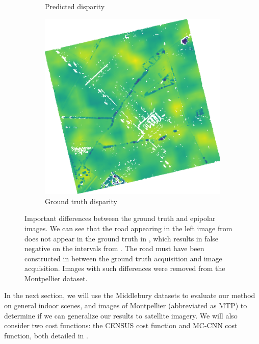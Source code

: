 \begin{figure}[ht!]
\begin{subfigure}[t]{0.4\linewidth}
        \caption{Predicted disparity}
        \label{fig:mtp_278_c}
    \end{subfigure}\hfill
    \begin{subfigure}[t]{0.4\linewidth}
        \centering
        \includegraphics[width=\linewidth]{Images/Chap_5/img_error_MTP_278_gt.png}
        \caption{Ground truth disparity}
        \label{fig:mtp_278_d}
    \end{subfigure}
    \caption{Important differences between the ground truth and epipolar images. We can see that the road appearing in the left image from  does not appear in the ground truth in , which results in false negative on the intervals from . The road must have been constructed in between the ground truth acquisition and image acquisition. Images with such differences were removed from the Montpellier dataset.} 
    \label{fig:mtp_278}
\end{figure}

In the next section, we will use the Middlebury datasets to evaluate our method on general indoor scenes, and images of Montpellier (abbreviated as $\mathrm{MTP}$) to determine if we can generalize our results to satellite imagery. We will also consider two cost functions: the CENSUS cost function and MC-CNN cost function, both detailed in .


